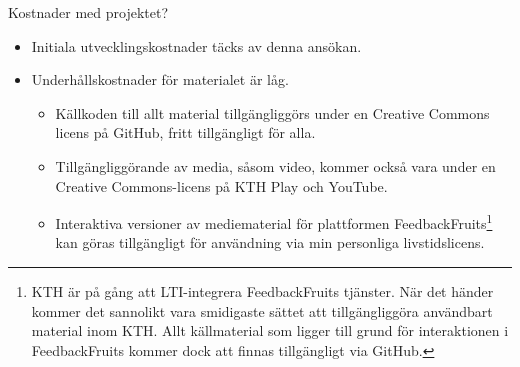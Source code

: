 \documentclass[a4paper,swedish]{article}
\begin{document}
Kostnader med projektet?
\begin{itemize}
  \item Initiala utvecklingskostnader täcks av denna ansökan.
  \item Underhållskostnader för materialet är låg.
    \begin{itemize}
      \item Källkoden till allt material tillgängliggörs under en Creative 
        Commons licens på GitHub, fritt tillgängligt för alla.
      \item Tillgängliggörande av media, såsom video, kommer också vara under 
        en Creative Commons-licens på KTH Play och YouTube.
      \item Interaktiva versioner av mediematerial för plattformen 
        FeedbackFruits\footnote{%
          KTH är på gång att LTI-integrera FeedbackFruits tjänster.
          När det händer kommer det sannolikt vara smidigaste sättet att 
          tillgängliggöra användbart material inom KTH.
          Allt källmaterial som ligger till grund för interaktionen i 
          FeedbackFruits kommer dock att finnas tillgängligt via GitHub.
        } kan göras tillgängligt för användning via min personliga 
        livstidslicens.
    \end{itemize}
\end{itemize}
\end{document}

